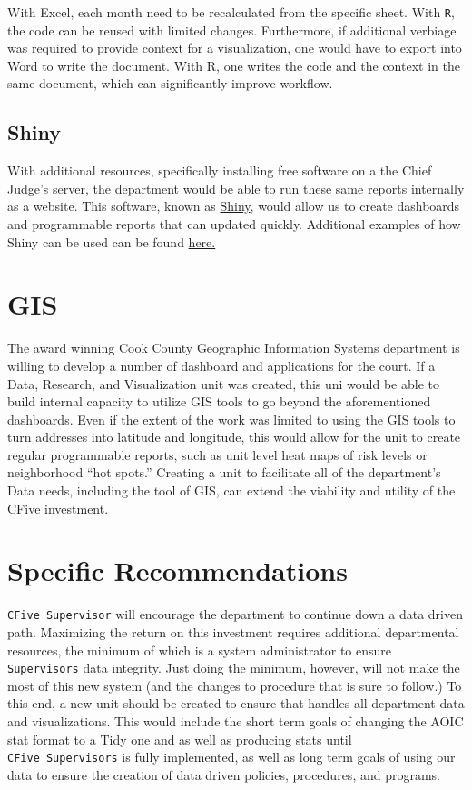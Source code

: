 \documentclass[12pt,]{article}
\begin{document}
With Excel, each month need to be recalculated from the specific sheet.
With \texttt{R}, the code can be reused with limited changes.
Furthermore, if additional verbiage was required to provide context for
a visualization, one would have to export into Word to write the
document. With R, one writes the code and the context in the same
document, which can significantly improve workflow.

\hypertarget{shiny}{%
\subsection{Shiny}\label{shiny}}

With additional resources, specifically installing free software on a
the Chief Judge's server, the department would be able to run these same
reports internally as a website. This software, known as
\href{https://shiny.rstudio.com}{Shiny}, would allow us to create
dashboards and programmable reports that can updated quickly. Additional
examples of how Shiny can be used can be found
\href{https://shiny.rstudio.com/gallery/}{here.}

\hypertarget{gis}{%
\section{GIS}\label{gis}}

The award winning Cook County Geographic Information Systems department
is willing to develop a number of dashboard and applications for the
court. If a Data, Research, and Visualization unit was created, this uni
would be able to build internal capacity to utilize GIS tools to go
beyond the aforementioned dashboards. Even if the extent of the work was
limited to using the GIS tools to turn addresses into latitude and
longitude, this would allow for the unit to create regular programmable
reports, such as unit level heat maps of risk levels or neighborhood
``hot spots.'' Creating a unit to facilitate all of the department's
Data needs, including the tool of GIS, can extend the viability and
utility of the CFive investment.

\hypertarget{specific-recommendations}{%
\section{Specific Recommendations}\label{specific-recommendations}}

\texttt{CFive\ Supervisor} will encourage the department to continue
down a data driven path. Maximizing the return on this investment
requires additional departmental resources, the minimum of which is a
system administrator to ensure \texttt{Supervisor\textquotesingle{}s}
data integrity. Just doing the minimum, however, will not make the most
of this new system (and the changes to procedure that is sure to
follow.) To this end, a new unit should be created to ensure that
handles all department data and visualizations. This would include the
short term goals of changing the AOIC stat format to a Tidy one and as
well as producing stats until
\texttt{CFive\ Supervisor\textquotesingle{}s} is fully implemented, as
well as long term goals of using our data to ensure the creation of data
driven policies, procedures, and programs.
\end{document}
